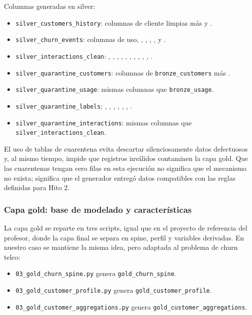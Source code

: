 \documentclass[12pt,a4paper]{article}
\begin{document}
Columnas generadas en silver:
\begin{itemize}
    \item \texttt{silver\_customers\_history}: columnas de cliente limpias más  y .
    \item \texttt{silver\_churn\_events}: columnas de uso, , , , ,  y .
    \item \texttt{silver\_interactions\_clean}: , , , , , , , , , , .
    \item \texttt{silver\_quarantine\_customers}: columnas de \texttt{bronze\_customers} más .
    \item \texttt{silver\_quarantine\_usage}: mismas columnas que \texttt{bronze\_usage}.
    \item \texttt{silver\_quarantine\_labels}: , , , , , , .
    \item \texttt{silver\_quarantine\_interactions}: mismas columnas que \texttt{silver\_interactions\_clean}.
\end{itemize}

El uso de tablas de cuarentena evita descartar silenciosamente datos defectuosos y, al mismo tiempo, impide que registros inválidos contaminen la capa gold. Que las cuarentenas tengan cero filas en esta ejecución no significa que el mecanismo no exista; significa que el generador entregó datos compatibles con las reglas definidas para Hito 2.

\subsubsection{Capa gold: base de modelado y características}

La capa gold se reparte en tres scripts, igual que en el proyecto de referencia del profesor, donde la capa final se separa en spine, perfil y variables derivadas. En nuestro caso se mantiene la misma idea, pero adaptada al problema de churn telco:
\begin{itemize}
    \item \texttt{03\_gold\_churn\_spine.py} genera \texttt{gold\_churn\_spine}.
    \item \texttt{03\_gold\_customer\_profile.py} genera \texttt{gold\_customer\_profile}.
    \item \texttt{03\_gold\_customer\_aggregations.py} genera \texttt{gold\_customer\_aggregations}.
\end{itemize}
\end{document}
